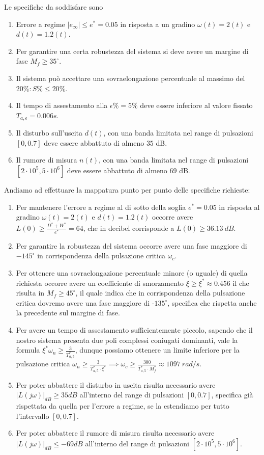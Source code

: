 \documentclass[a4paper, 11pt]{article}
\begin{document}
Le specifiche da soddisfare sono
\begin{enumerate}
    \item Errore a regime $|e_\infty|\leq e^* = 0.05$ in risposta a un gradino $\omega(t) = 2(t)$ e $d(t) = 1.2(t)$.
    \item Per garantire una certa robustezza del sistema si deve avere un margine di fase $M_f \geq 35^\circ$.
    \item Il sistema può accettare una sovraelongazione percentuale al massimo del $20\%: S\% \leq 20\%$.
    \item Il tempo di assestamento alla $\epsilon \% = 5\%$ deve essere inferiore al valore fissato $T_{a,\epsilon} = 0.006s$.
    \item Il disturbo sull'uscita $d(t)$, con una banda limitata nel range di pulsazioni $[0, 0.7]$ deve essere abbattuto di almeno $35$ dB.
    \item Il rumore di misura $n(t)$, con una banda limitata nel range di pulsazioni $[2\cdot 10^5, 5\cdot10^6]$ deve essere abbattuto di almeno $69$ dB.
\end{enumerate}

Andiamo ad effettuare la mappatura punto per punto delle specifiche richieste:
\begin{enumerate}
    \item Per mantenere l'errore a regime al di sotto della soglia $e^* = 0.05$ in risposta al gradino $\omega(t) = 2(t)$ e $d(t) = 1.2(t)$ occorre avere $L(0) \geq \frac {D^* + W^*} {e^*} = 64$, che in decibel corrisponde a $L(0) \geq 36.13 \ dB$.
    \item Per garantire la robustezza del sistema occorre avere una fase maggiore di $-145^\circ$ in corrispondenza della pulsazione critica $\omega_c$.
    \item Per ottenere una sovraelongazione percentuale minore (o uguale) di quella richiesta occorre avere un coefficiente di smorzamento $\xi \geq \xi^* \approx 0.456$ il che risulta in $M_f \geq 45^\circ$, il quale indica che in corrispondenza della pulsazione critica dovremo avere una fase maggiore di -$135^\circ$, specifica che rispetta anche la precedente sul margine di fase.
    \item Per avere un tempo di assestamento sufficientemente piccolo, sapendo che il nostro sistema presenta due poli complessi coniugati dominanti, vale la formula $\xi^*\omega_n \geq \frac 3 {T_{a, 5}^*}$, dunque possiamo ottenere un limite inferiore per la pulsazione critica $\omega_n \geq \frac 3 {T_{a, 5}^* \cdot \xi^*} \implies \omega_c \geq \frac {300} {T_{a, 5}^* \cdot M_f^*} \approx 1097 \ rad/s$.
    \item Per poter abbattere il disturbo in uscita risulta necessario avere $|L(j\omega)|_{dB} \geq 35dB$ all'interno del range di pulsazioni $[0, 0.7]$, specifica già rispettata da quella per l'errore a regime, se la estendiamo per tutto l'intervallo $[0, 0.7]$. 
    \item Per poter abbattere il rumore di misura risulta necessario avere $|L(j\omega)|_{dB} \leq -69dB$ all'interno del range di pulsazioni $[2\cdot10^5, 5\cdot10^6]$.
\end{enumerate}
\end{document}
